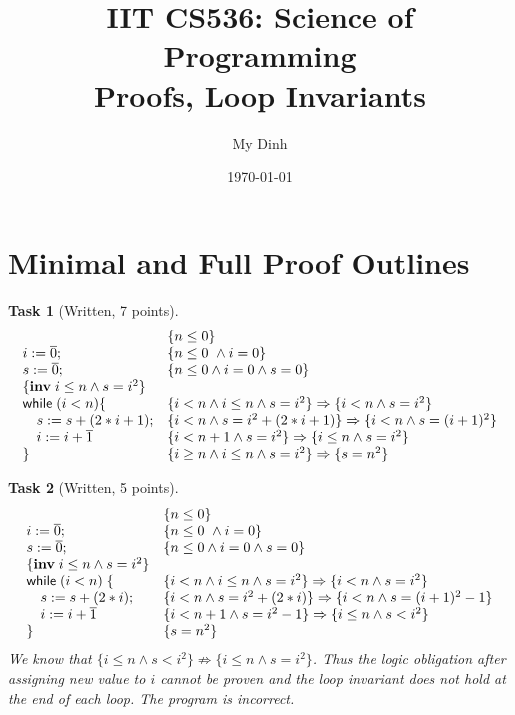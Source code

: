 \documentclass{article}
\title{IIT CS536: Science of Programming\\
  {\large Proofs, Loop Invariants}}
\author{My Dinh}
\date{\today}
\newcommand{\stmt}[1]{\text{\sffamily #1}}
\newcommand{\whiles}[1]{\stmt{while}\;(#1)\;\{}
\newcommand{\assigns}[2]{#1 := #2}
\newcommand{\consts}[1]{\overline{#1}}
\newcommand{\inv}[1]{\{\textbf{inv}\;\ensuremath{#1}\}}
\theoremstyle{task}
\newtheorem{task}{Task}[section]
\begin{document}
\maketitle

\section{Minimal and Full Proof Outlines}

\begin{task}[Written, 7 points]
    \[
        \begin{array}{l l}
            & \{n \leq 0\} \\
            \assigns{i}{\consts{0}}; & \{n \leq 0\ \wedge i = 0\} \\
            \assigns{s}{\consts{0}}; & \{n \leq 0 \wedge i = 0 \wedge s = 0\} \\
            \inv{i \leq n \wedge s = i^2} & \\
            \stmt{while} \; (i < n) \{ & \{i < n \wedge i \leq n \wedge s = i^2\} \Rightarrow \{i < n \wedge s = i^2\} \\
            \quad \assigns{s}{s + (2 * i + 1)}; & \{i < n \wedge s = i^2 + (2*i + 1)\} \Rightarrow \{i < n \wedge s = (i + 1)^2 \}\\
            \quad \assigns{i}{i + \consts{1}} & \{i < n + 1 \wedge s = i^2\} \Rightarrow \{i \leq n \wedge s = i^2\} \\
            \} & \{i \geq n \wedge i \leq n \wedge s = i^2\} \Rightarrow \{s = n^2\}
        \end{array}
    \]
\end{task}

\begin{task}[Written, 5 points]
    \[
        \begin{array}{l l}
            & \{n \leq 0\} \\
            \assigns{i}{\consts{0}}; & \{n \leq 0\ \wedge i = 0\} \\
            \assigns{s}{\consts{0}}; & \{n \leq 0 \wedge i = 0 \wedge s = 0\} \\
            \inv{i \leq n \wedge s = i^2} & \\
            \whiles{i < n}& \{i < n \wedge i \leq n \wedge s = i^2\} \Rightarrow \{i < n \wedge s = i^2\} \\
            \quad \assigns{s}{s + (2 * i)}; & \{i < n \wedge s = i^2 + (2*i)\} \Rightarrow \{i < n \wedge s = (i + 1)^2 - 1 \} \\
            \quad \assigns{i}{i + \consts{1}} & \{i < n + 1 \wedge s = i^2 - 1\} \Rightarrow \{i \leq n \wedge s < i^2 \} \\
            \} & \{s = n^2\}
        \end{array}
    \]
    We know that $\{i \leq n \wedge s < i^2\} \not \Rightarrow
    \{i \leq n \wedge s = i^2\}$. Thus the logic obligation after assigning new
    value to $i$ cannot be proven and the loop invariant does not hold at the end
    of each loop. The program is incorrect.
\end{task}
\end{document}
